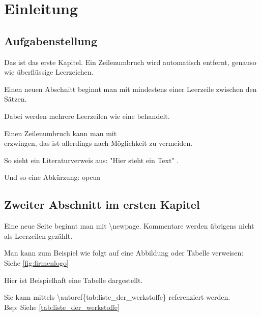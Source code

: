 \chapter{Einleitung}        %
\section{Aufgabenstellung}  %
Das ist das erste Kapitel.
Ein Zeilenumbruch wird automatisch entfernt, genauso    wie   überflüssige                 Leerzeichen.

Einen neuen Abschnitt beginnt man mit mindestens einer Leerzeile zwischen den Sätzen.




Dabei werden mehrere Leerzeilen wie eine behandelt.

Einen Zeilenumbruch kann man mit \\ erzwingen, das ist allerdings nach Möglichkeit zu vermeiden.

So sieht ein Literaturverweis aus: "Hier steht ein Text" \cite{OPCFoundation}.

Und so eine Abkürzung: \Gls{opcua}
\newpage
\section{Zweiter Abschnitt im ersten Kapitel}
Eine neue Seite beginnt man mit \textbackslash newpage.
Kommentare werden übrigens nicht als Leerzeilen gezählt.


Man kann zum Beispiel wie folgt auf eine Abbildung oder Tabelle verweisen: Siehe \autoref{fig:firmenlogo}

\newpage
Hier ist Beispielhaft eine Tabelle dargestellt.

Sie kann mittels \textbackslash autoref\{tab:liste\_der\_werkstoffe\} referenziert werden.\\
Bsp: \glqq Siehe \autoref{tab:liste_der_werkstoffe}\grqq

